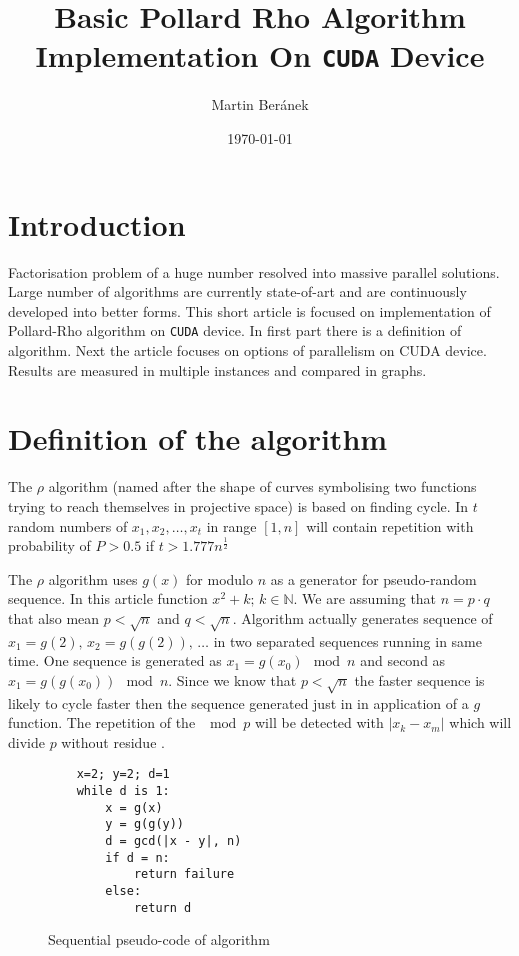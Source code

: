 \documentclass[a4paper]{article}
\begin{document}
\title{Basic Pollard Rho Algorithm Implementation On \texttt{CUDA} Device}
\author{Martin Beránek}
\date{\today}
\maketitle


\section{Introduction}

Factorisation problem of a huge number resolved into massive parallel solutions. Large number of algorithms are currently state-of-art and are continuously developed into better forms. This short article is focused on implementation of Pollard-Rho algorithm on \texttt{CUDA} device. In first part there is a definition of algorithm. Next the article focuses on options of parallelism on CUDA device. Results are measured in multiple instances and compared in graphs. 

\section{Definition of the algorithm}

The $\rho$ algorithm (named after the shape of curves symbolising two functions trying to reach themselves in projective space) is based on finding cycle. In $t$ random numbers of $x_1, x_2, \dots, x_t$ in range $[1, n]$ will contain repetition with probability of $P > 0.5$ if $t > 1.777n^{\frac{1}{2}}$

The $\rho$ algorithm uses $g(x)$ for modulo $n$ as a generator for pseudo-random sequence. In this article function $x^2 + k;\, k \in \mathbb{N}$. We are assuming that $n = p \cdot q$ that also mean $p < \sqrt{n}$ and $q < \sqrt{n}$. Algorithm actually generates sequence of $x_1 = g(2),\,x_2 = g(g(2)),\,\dots$ in two separated sequences running in same time. One sequence is generated as $x_1=g(x_0) \mod n$ and second as $x_1=g(g(x_0)) \mod n$. Since we know that $p < \sqrt{n}$ the faster sequence is likely to cycle faster then the sequence generated just in in application of a $g$ function. The repetition of the $\mod p$ will be detected with $| x_k - x_m |$ which will divide $p$ without residue \cite{wiki}.

\begin{figure}[H]
	\centering
	\begin{lstlisting}
    x=2; y=2; d=1
    while d is 1:
        x = g(x)
        y = g(g(y))
        d = gcd(|x - y|, n)
        if d = n: 
            return failure
        else:
            return d
	\end{lstlisting}
	\caption{Sequential pseudo-code of algorithm}
	\label{singl_alg}
\end{figure}
\end{document}
